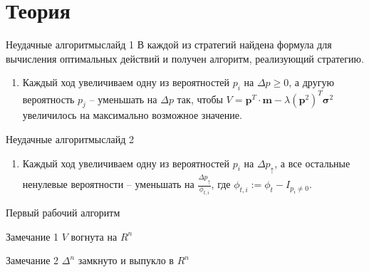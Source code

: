 \documentclass[11pt]{beamer} %
\begin{document}
\section{Теория}
    \begin{frame}{Неудачные алгоритмы}{слайд 1}
        В каждой из стратегий найдена формула для вычисления оптимальных действий и получен алгоритм, реализующий стратегию.
        \begin{enumerate}
            \item<1-> Каждый ход увеличиваем одну из вероятностей $p_i$ на $\Delta p \geq 0$, а другую вероятность $p_j$ -- уменьшать на $\Delta p$ так, чтобы $V = \textbf{p}^T \cdot \textbf{m} - \lambda (\textbf{p}^2)^T \boldsymbol{\sigma}^2 $ увеличилось на максимально возможное значение.
            \setcounter{currentenumi}{\theenumi}
        \end{enumerate}
    \end{frame}
    \begin{frame}{Неудачные алгоритмы}{слайд 2}
        \begin{enumerate}
        \setcounter{enumi}{\thecurrentenumi}
            \item<1-> Каждый ход увеличиваем одну из вероятностей $p_i$ на $\Delta p_{\uparrow}$, а все остальные ненулевые вероятности -- уменьшать на $\frac{\Delta p_{\uparrow}}{\phi_{t,i}}$, где $\phi_{t,i} := \phi_t - I_{p_i \neq 0}$.
        \end{enumerate}
    \end{frame}
    \begin{frame}{Первый рабочий алгоритм}
        \begin{block}{Замечание 1}
            $V$ вогнута на $R^n$
        \end{block}
        \begin{block}{Замечание 2}
            $\Delta^n$ замкнуто и выпукло в $R^n$
        \end{block}
    \end{frame}
\end{document}
